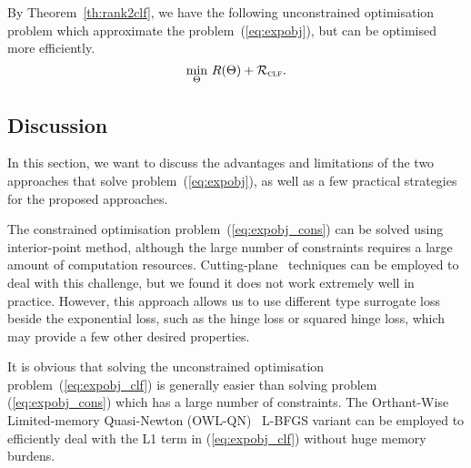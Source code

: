 By Theorem~\ref{th:rank2clf}, we have the following unconstrained optimisation problem
which approximate the problem~(\ref{eq:expobj}),
but can be optimised more efficiently.
\begin{equation}
\label{eq:expobj_clf}
\min_{\Theta} \, R(\Theta) + \mathcal{R}_\textsc{clf}.
\end{equation}



\subsection{Discussion}

In this section, we want to discuss the advantages and limitations of the 
two approaches that solve problem~(\ref{eq:expobj}), 
as well as a few practical strategies for the proposed approaches.

The constrained optimisation problem~(\ref{eq:expobj_cons}) can be solved using interior-point method,
although the large number of constraints requires a large amount of computation resources.
Cutting-plane~\cite{} techniques can be employed to deal with this challenge, 
but we found it does not work extremely well in practice.
However, this approach allows us to use different type surrogate loss beside the exponential loss,
such as the hinge loss or squared hinge loss, which may provide a few other desired properties. %

It is obvious that solving the unconstrained optimisation problem~(\ref{eq:expobj_clf})
is generally easier than solving problem (\ref{eq:expobj_cons}) which has a large number of constraints.
The Orthant-Wise Limited-memory Quasi-Newton (OWL-QN)~\cite{} L-BFGS variant can be employed to
efficiently deal with the L1 term in (\ref{eq:expobj_clf}) without huge memory burdens.
